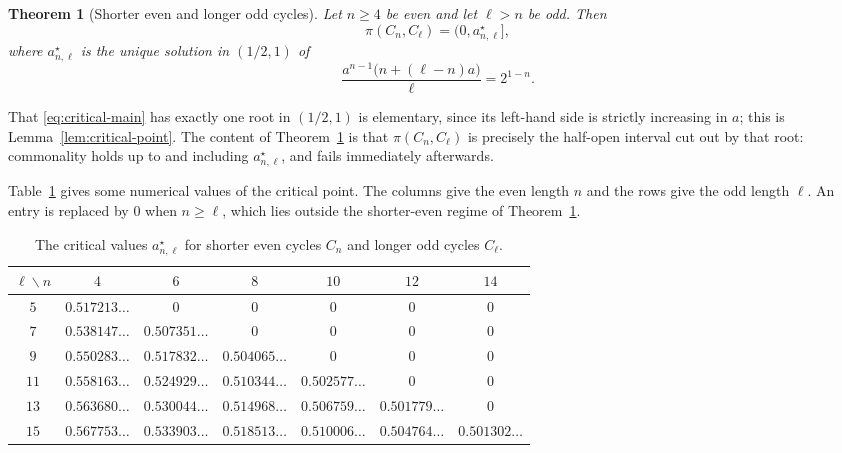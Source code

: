 \documentclass[11pt]{article}
\newtheorem{theorem}{Theorem}[section]
\theoremstyle{definition}
\theoremstyle{remark}
\begin{document}
\begin{theorem}[Shorter even and longer odd cycles]
  \label{thm:main}
  Let $n\ge4$ be even and let $\ell>n$ be odd.  Then
  \[
    \pi(C_n,C_\ell)=\bigl(0,a_{n,\ell}^{\star}\bigr],
  \]
  where $a_{n,\ell}^{\star}$ is the unique solution in $(1/2,1)$ of
  \begin{equation}
    \frac{a^{n-1}\bigl(n+(\ell-n)a\bigr)}{\ell}
    =2^{1-n}.
    \label{eq:critical-main}
  \end{equation}
\end{theorem}

That \eqref{eq:critical-main} has exactly one root in $(1/2,1)$ is elementary,
since its left-hand side is strictly increasing in $a$; this is
Lemma~\ref{lem:critical-point}.  The content of Theorem~\ref{thm:main} is that
$\pi(C_n,C_\ell)$ is precisely the half-open interval cut out by that root:
commonality holds up to and including $a_{n,\ell}^{\star}$, and fails
immediately afterwards.

Table~\ref{tab:critical-values} gives some numerical values of the critical
point.  The columns give the even length $n$ and
the rows give the odd length $\ell$.  An entry is replaced by $0$ when
$n\ge\ell$, which lies outside the shorter-even regime of
Theorem~\ref{thm:main}.

\begin{table}[ht]
  \centering
  \begin{tabular}{c@{\qquad}cccccc}
    \toprule
    $\ell\backslash n$ & $4$ & $6$ & $8$ & $10$ & $12$ & $14$ \\
    \midrule
    $5$  & $0.517213\ldots$ & $0$ & $0$ & $0$ & $0$ & $0$ \\
    $7$  & $0.538147\ldots$ & $0.507351\ldots$ & $0$ & $0$ & $0$ & $0$ \\
    $9$  & $0.550283\ldots$ & $0.517832\ldots$ & $0.504065\ldots$ & $0$ & $0$ & $0$ \\
    $11$ & $0.558163\ldots$ & $0.524929\ldots$ & $0.510344\ldots$ & $0.502577\ldots$ & $0$ & $0$ \\
    $13$ & $0.563680\ldots$ & $0.530044\ldots$ & $0.514968\ldots$ & $0.506759\ldots$ & $0.501779\ldots$ & $0$ \\
    $15$ & $0.567753\ldots$ & $0.533903\ldots$ & $0.518513\ldots$ & $0.510006\ldots$ & $0.504764\ldots$ & $0.501302\ldots$ \\
    \bottomrule
  \end{tabular}
  \caption{The critical values $a_{n,\ell}^{\star}$ for shorter even cycles
  $C_n$ and longer odd cycles $C_\ell$.}
  \label{tab:critical-values}
\end{table}
\end{document}
